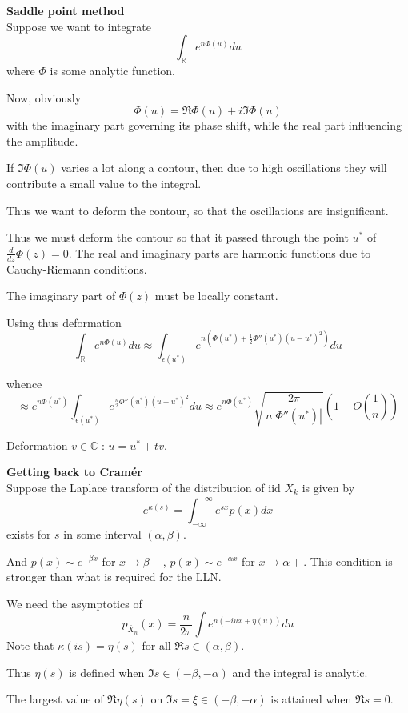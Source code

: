 \documentclass[a4paper]{article}
\newcommand{\brac}[1]{{\left ( #1 \right )}}
\newcommand{\abs}[1]{{\left | #1 \right |}}
\newcommand{\Real}{\mathbb{R}}
\newcommand{\Cplx}{\mathbb{C}}
\begin{document}
\noindent \textbf{Saddle point method} \hfill\\
Suppose we want to integrate 
\[\int_\Real e^{n\Phi(u)} du\]
where $\Phi$ is some analytic function.

Now, obviously 
\[\Phi(u) = \Re \Phi(u) + i \Im\Phi(u)\]
with the imaginary part governing its phase shift, while the real part influencing the amplitude.

If $\Im\Phi(u)$ varies a lot along a contour, then due to high oscillations they will contribute a small value to the integral.

Thus we want to deform the contour, so that the oscillations are insignificant.

Thus we must deform the contour so that it passed through the point $u^*$ of $\frac{d}{d z}\Phi(z) = 0$. The real and imaginary parts are harmonic functions due to Cauchy-Riemann conditions.

The imaginary part of $\Phi(z)$ must be locally constant.

Using thus deformation
\[\int_\Real e^{n\Phi(u)} du \approx \int_{\epsilon(u^*)} e^{n\brac{\Phi(u^*) + \frac{1}{2}\Phi''(u^*) \brac{u-u^*}^2}} du\]

whence 
\[\approx e^{n\Phi(u^*)} \int_{\epsilon(u^*)} e^{\frac{n}{2}\Phi''(u^*) {(u-u^*)}^2} du \approx e^{n\Phi(u^*)} \sqrt{\frac{2\pi}{n\abs{\Phi''(u^*)}}}\brac{1 + O(\frac{1}{n})}\]

Deformation $v\in \Cplx$ : $u = u^* + t v$.

\noindent \textbf{Getting back to Cram\'er} \hfill\\

Suppose the Laplace transform of the distribution of iid $X_k$ is given by
\[e^{\kappa(s)} = \int_{-\infty}^{+\infty} e^{sx} p(x) dx\]
exists for $s$ in some interval $\brac{\alpha,\beta}$.

And $p(x) \sim e^{-\beta x}$ for $x\to \beta-$, $p(x) \sim e^{-\alpha x}$ for $x\to \alpha+$. This condition is stronger than what is required for the LLN.

We need the asymptotics of
\[p_{\bar{X}_n}(x) = \frac{n}{2\pi}\int e^{n\brac{-iux + \eta(u)}} du\]
Note that $\kappa(is) = \eta(s)$ for all $\Re s \in \brac{\alpha, \beta}$.

Thus $\eta(s)$ is defined when $\Im s\in \brac{-\beta, -\alpha}$ and the integral is analytic.

The largest value of $\Re \eta(s)$ on $\Im s = \xi \in \brac{-\beta, -\alpha}$ is attained when $\Re s = 0$.
\end{document}
